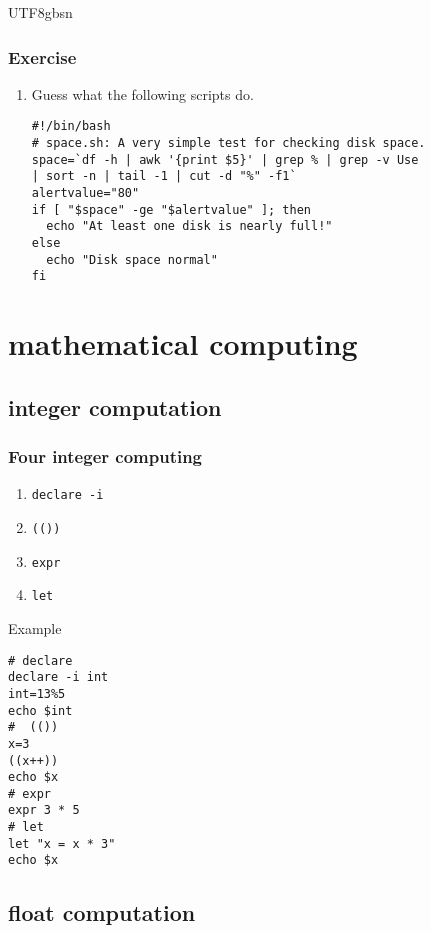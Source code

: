 \documentclass[red]{beamer}
\newcommand*{\lstverb}{\lstinline[style=caret]}
\begin{document}
\begin{CJK*}{UTF8}{gbsn}
\begin{frame}
\frametitle{Exercise}
\begin{enumerate}
	\item Guess what the following scripts do.
	\begin{lstlisting}
#!/bin/bash
# space.sh: A very simple test for checking disk space.
space=`df -h | awk '{print $5}' | grep % | grep -v Use
| sort -n | tail -1 | cut -d "%" -f1`
alertvalue="80"
if [ "$space" -ge "$alertvalue" ]; then
  echo "At least one disk is nearly full!"
else
  echo "Disk space normal"
fi
	\end{lstlisting}
\end{enumerate}
\end{frame}

\section{mathematical computing}

\subsection{integer computation}

\begin{frame}
\frametitle{Four integer computing}
\begin{enumerate}
	\item \lstverb|declare -i|
	\item \lstverb|(())|
	\item \lstverb|expr|
	\item \lstverb|let|
\end{enumerate}
\begin{block}{\centering Example}
\begin{lstlisting}
# declare
declare -i int
int=13%5
echo $int
#  (())
x=3
((x++))
echo $x
# expr
expr 3 * 5
# let
let "x = x * 3"
echo $x
\end{lstlisting}
\end{block}
\end{frame}

\subsection{float computation}


\end{CJK*}
\end{document}
